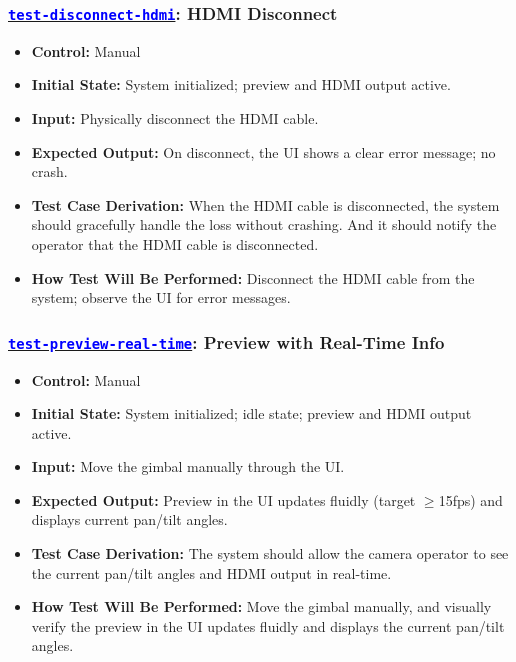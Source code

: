 \documentclass[12pt, titlepage]{article}
\newcommand{\tid}[1]{\hyperlink{tid:#1}{\textcolor{blue}{\texttt{#1}}}}
\begin{document}
\subsubsection*{\tid{test-disconnect-hdmi}: HDMI Disconnect}
\begin{itemize}
  \item \textbf{Control:} Manual
  \item \textbf{Initial State:} System initialized; preview and HDMI output active.
  \item \textbf{Input:} Physically disconnect the HDMI cable.
  \item \textbf{Expected Output:} On disconnect, the UI shows a clear error message; no crash.
  \item \textbf{Test Case Derivation:} When the HDMI cable is disconnected, the system should gracefully handle the loss without crashing. And it should notify the operator that the HDMI cable is disconnected.
  \item \textbf{How Test Will Be Performed:} Disconnect the HDMI cable from the system; observe the UI for error messages.
\end{itemize}

\subsubsection*{\tid{test-preview-real-time}: Preview with Real-Time Info}
\begin{itemize}
  \item \textbf{Control:} Manual
  \item \textbf{Initial State:} System initialized; idle state; preview and HDMI output active.
  \item \textbf{Input:} Move the gimbal manually through the UI.
  \item \textbf{Expected Output:} Preview in the UI updates fluidly (target $\geq$15fps) and displays current pan/tilt angles.
  \item \textbf{Test Case Derivation:} The system should allow the camera operator to see the current pan/tilt angles and HDMI output in real-time.
  \item \textbf{How Test Will Be Performed:} Move the gimbal manually, and visually verify the preview in the UI updates fluidly and displays the current pan/tilt angles.
\end{itemize}
\end{document}
